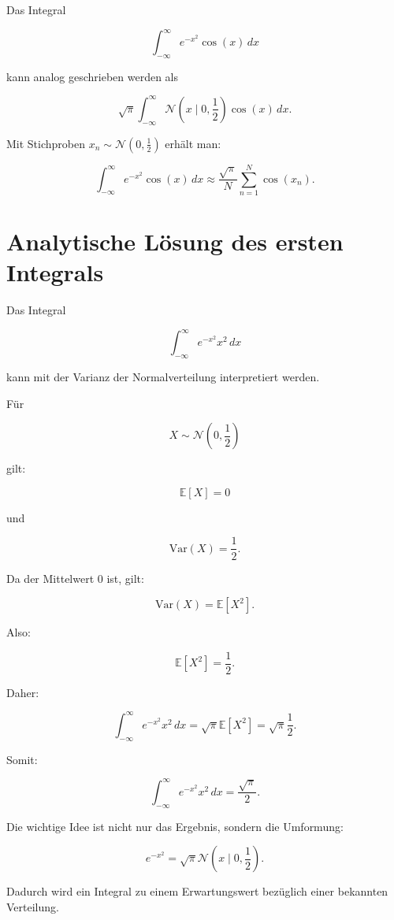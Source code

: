 \begin{examplebox}
Das Integral

\[
    \int_{-\infty}^{\infty}
    e^{-x^2}\cos(x)\,dx
\]

kann analog geschrieben werden als

\[
    \sqrt{\pi}
    \int_{-\infty}^{\infty}
    \mathcal{N}\left(x \mid 0,\frac{1}{2}\right)
    \cos(x)\,dx.
\]

Mit Stichproben \(x_n \sim \mathcal{N}(0,\frac{1}{2})\) erhält man:

\[
    \int_{-\infty}^{\infty}
    e^{-x^2}\cos(x)\,dx
    \approx
    \frac{\sqrt{\pi}}{N}
    \sum_{n=1}^{N}
    \cos(x_n).
\]
\end{examplebox}

\section{Analytische Lösung des ersten Integrals}

Das Integral

\[
    \int_{-\infty}^{\infty}
    e^{-x^2}x^2\,dx
\]

kann mit der Varianz der Normalverteilung interpretiert werden.

Für

\[
    X \sim \mathcal{N}\left(0,\frac{1}{2}\right)
\]

gilt:

\[
    \mathbb{E}[X] = 0
\]

und

\[
    \mathrm{Var}(X) = \frac{1}{2}.
\]

Da der Mittelwert \(0\) ist, gilt:

\[
    \mathrm{Var}(X)
    =
    \mathbb{E}[X^2].
\]

Also:

\[
    \mathbb{E}[X^2]
    =
    \frac{1}{2}.
\]

Daher:

\[
    \int_{-\infty}^{\infty}
    e^{-x^2}x^2\,dx
    =
    \sqrt{\pi}
    \mathbb{E}[X^2]
    =
    \sqrt{\pi}
    \frac{1}{2}.
\]

Somit:

\[
    \int_{-\infty}^{\infty}
    e^{-x^2}x^2\,dx
    =
    \frac{\sqrt{\pi}}{2}.
\]

\begin{examtipbox}
Die wichtige Idee ist nicht nur das Ergebnis, sondern die Umformung:

\[
    e^{-x^2}
    =
    \sqrt{\pi}
    \mathcal{N}\left(x \mid 0,\frac{1}{2}\right).
\]

Dadurch wird ein Integral zu einem Erwartungswert bezüglich einer bekannten Verteilung.
\end{examtipbox}

